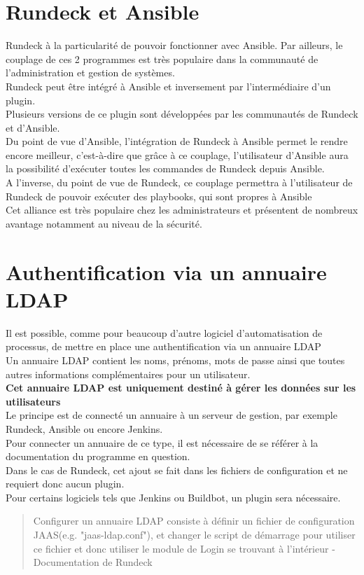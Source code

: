 \documentclass[12pt]{article}
\begin{document}
\section{Rundeck et Ansible}
Rundeck à la particularité de pouvoir fonctionner avec Ansible. Par ailleurs, le couplage de ces 2 programmes est très populaire dans la communauté de l'administration et gestion de systèmes. 
\\
Rundeck peut être intégré à Ansible et inversement par l'intermédiaire d'un plugin.
\\
Plusieurs versions de ce plugin sont développées par les communautés de Rundeck et d'Ansible.
\\
Du point de vue d'Ansible, l'intégration de Rundeck à Ansible permet le rendre encore meilleur, c'est-à-dire que grâce à ce couplage, l'utilisateur d'Ansible aura la possibilité d'exécuter toutes les commandes de Rundeck depuis Ansible.
\\
A l'inverse, du point de vue de Rundeck, ce couplage permettra à l'utilisateur de Rundeck de pouvoir exécuter des playbooks, qui sont propres à Ansible
\\
Cet alliance est très populaire chez les administrateurs et présentent de nombreux avantage notamment au niveau de la sécurité.

\section{Authentification via un annuaire LDAP}
Il est possible, comme pour beaucoup d'autre logiciel d'automatisation de processus, de mettre en place une authentification via un annuaire LDAP\footnotemark[1]
\\
Un annuaire LDAP contient les noms, prénoms, mots de passe ainsi que toutes autres informations complémentaires pour un utilisateur.
\\
\textbf{Cet annuaire LDAP est uniquement destiné à gérer les données sur les utilisateurs}
\\
Le principe est de connecté un annuaire à un serveur de gestion, par exemple Rundeck, Ansible ou encore Jenkins.
\\
Pour connecter un annuaire de ce type, il est nécessaire de se référer à la documentation du programme en question.
\\
Dans le cas de Rundeck, cet ajout se fait dans les fichiers de configuration et ne requiert donc aucun plugin.
\\
Pour certains logiciels tels que Jenkins ou Buildbot, un plugin sera nécessaire.
\\
\begin{quote}
    Configurer un annuaire LDAP consiste à définir un fichier de configuration JAAS\footnotemark[2] (e.g. "jaas-ldap.conf"), et changer le script de démarrage pour utiliser ce fichier et donc utiliser le module de Login se trouvant à l'intérieur - Documentation de Rundeck
\end{quote}
\end{document}
